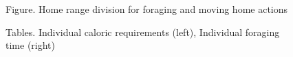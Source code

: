 \documentclass[11pt,oneside,a4paper,openright]{report}
\begin{document}




\begin{figure}[h]
\centering
\setlength\fboxsep{0pt}
\setlength\fboxrule{0.5pt}
\caption{Figure. Home range division for foraging and moving home actions}
\label{fig:sectorsDivision}
\end{figure}



\begin{figure}[h]
\centering
\setlength\fboxsep{0pt}
\setlength\fboxrule{0.5pt}
\caption{Tables. Individual caloric requirements (left), Individual foraging time (right)}
\label{fig:caloricRequ}
\end{figure}
\end{document}

